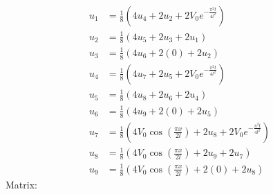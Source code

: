 \documentclass[11pt]{article}
\numberwithin{equation}{section}
\begin{document}
\begin{align}
    u_1 &= \frac{1}{8}\left(4u_4 + 2u_2 + 2V_0 e^{-\frac{\pi^2 t }{4l^2}}\right)\\
    u_2 &= \frac{1}{8}\left(4u_5 + 2u_3 + 2u_1\right)\\
    u_3 &= \frac{1}{8}\left(4u_6 + 2(0) + 2u_2\right)\\
    u_4 &= \frac{1}{8}\left(4u_7 + 2u_5 + 2V_0 e^{-\frac{\pi^2 t }{4l^2}}\right)\\
    u_5 &= \frac{1}{8}\left(4u_8 + 2u_6 + 2u_4\right)\\
    u_6 &= \frac{1}{8}\left(4u_9 + 2(0) + 2u_5\right)\\
    u_7 &= \frac{1}{8}\left(4V_0\cos\left(\frac{\pi x}{2l}\right) + 2u_8 + 2V_0 e^{-\frac{\pi^2 t }{4l^2}}\right)\\
    u_8 &= \frac{1}{8}\left(4V_0\cos\left(\frac{\pi x}{2l}\right) + 2u_9 + 2u_7\right)\\
    u_9 &= \frac{1}{8}\left(4V_0\cos\left(\frac{\pi x}{2l}\right) + 2(0) + 2u_8\right)
\end{align}
Matrix:
\end{document}
